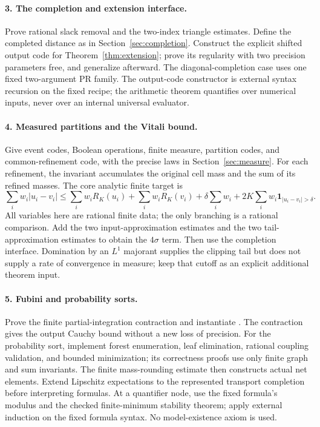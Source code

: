 \paragraph{3. The completion and extension interface.}
Prove rational slack removal and the two-index triangle estimates. Define the completed distance as in Section~\ref{sec:completion}. Construct the explicit shifted output code for Theorem~\ref{thm:extension}; prove its regularity with two precision parameters free, and generalize afterward. The diagonal-completion case uses one fixed two-argument PR family. The output-code constructor is external syntax recursion on the fixed recipe; the arithmetic theorem quantifies over numerical inputs, never over an internal universal evaluator.

\paragraph{4. Measured partitions and the Vitali bound.}
Give event codes, Boolean operations, finite measure, partition codes, and common-refinement code, with the precise laws in Section~\ref{sec:measure}. For each refinement, the invariant accumulates the original cell mass and the sum of its refined masses. The core analytic finite target is
\[
 \sum_iw_i|u_i-v_i|
 \le\sum_iw_iR_K(u_i)+\sum_iw_iR_K(v_i)
       +\delta\sum_iw_i+2K\sum_iw_i\mathbf1_{|u_i-v_i|>\delta}.
\]
All variables here are rational finite data; the only branching is a rational comparison. Add the two input-approximation estimates and the two tail-approximation estimates to obtain the $4\sigma$ term. Then use the completion interface. Domination by an $L^1$ majorant supplies the clipping tail but does not supply a rate of convergence in measure; keep that cutoff as an explicit additional theorem input.

\paragraph{5. Fubini and probability sorts.}
Prove the finite partial-integration contraction and instantiate . The contraction gives the output Cauchy bound without a new loss of precision. For the probability sort, implement forest enumeration, leaf elimination, rational coupling validation, and bounded minimization; its correctness proofs use only finite graph and sum invariants. The finite mass-rounding estimate then constructs actual net elements. Extend Lipschitz expectations to the represented transport completion before interpreting formulas. At a quantifier node, use the fixed formula's modulus and the checked finite-minimum stability theorem; apply external induction on the fixed formula syntax. No model-existence axiom is used.

